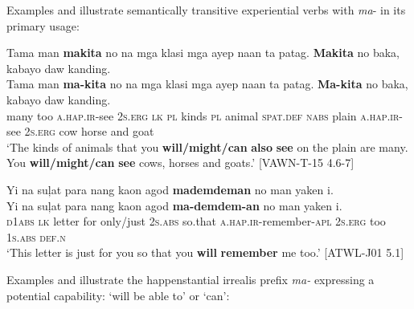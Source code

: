 \hspace*{-.7pt}Examples  and  illustrate semantically transitive experiential verbs with \textit{ma}{}- in its primary usage:

\ea
\label{bkm:Ref119353744}
Tama  man  \textbf{makita}  no  na  mga  klasi  mga  ayep  naan  ta  patag. \textbf{Makita}  no  baka,  kabayo  daw  kanding. \\\smallskip
 \gll Tama  man  \textbf{ma-kita}  no  na  mga  klasi  mga  ayep  naan  ta  patag. \textbf{Ma-kita}  no  baka,  kabayo  daw  kanding. \\
many  too  \textsc{a.hap.ir}-see  2\textsc{s.erg}  \textsc{lk}  \textsc{pl}  kinds  \textsc{pl}  animal  \textsc{spat.def}  \textsc{nabs} plain
\textsc{a.hap.ir}-see  2\textsc{s.erg}  cow  horse  and  goat \\
\glt `The kinds of animals that you \textbf{will/might/can} \textbf{also} \textbf{see} on the plain are many. You \textbf{will/might/can} \textbf{see} cows, horses and goats.’ [VAWN-T-15 4.6-7]
\z

\newpage
\ea
\label{bkm:Ref119353747}
Yi  na  suļat  para  nang  kaon  agod  \textbf{mademdeman}  no man  yaken  i. \\\smallskip
 \gll Yi  na  suļat  para  nang  kaon  agod  \textbf{ma-demdem-an}  no man  yaken  i. \\
\textsc{d}1\textsc{abs}  \textsc{lk}  letter  for  only/just  2\textsc{s.abs}  so.that   \textsc{a.hap.ir}-remember-\textsc{apl}  2\textsc{s.erg}
too  1\textsc{s.abs}  \textsc{def.n} \\
\glt `This letter is just for you so that you \textbf{will} \textbf{remember} me too.’ [ATWL-J01 5.1]
\z

Examples  and  illustrate the happenstantial irrealis prefix \textit{ma-} expressing a potential capability: `will be able to' or `can':

